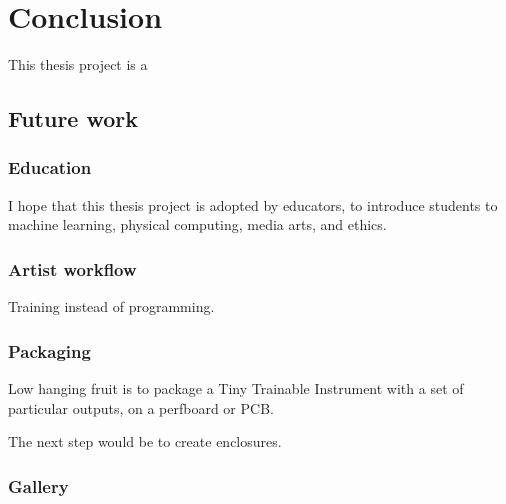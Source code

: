\chapter{Conclusion}

This thesis project is a

\section{Future work}

\subsection{Education}

I hope that this thesis project is adopted by educators, to introduce students to machine learning, physical computing, media arts, and ethics.

\subsection{Artist workflow}

Training instead of programming.

\subsection{Packaging}

Low hanging fruit is to package a Tiny Trainable Instrument with a set of particular outputs, on a perfboard or PCB.

The next step would be to create enclosures.

\subsection{Gallery}
